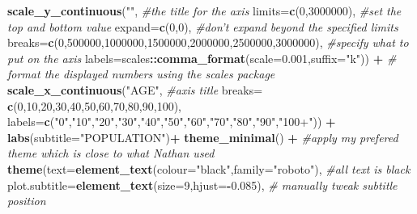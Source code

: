 \documentclass[]{article}
\newenvironment{Shaded}{\begin{snugshade}}{\end{snugshade}}
\newcommand{\KeywordTok}[1]{\textcolor[rgb]{0.13,0.29,0.53}{\textbf{#1}}}
\newcommand{\DataTypeTok}[1]{\textcolor[rgb]{0.13,0.29,0.53}{#1}}
\newcommand{\DecValTok}[1]{\textcolor[rgb]{0.00,0.00,0.81}{#1}}
\newcommand{\FloatTok}[1]{\textcolor[rgb]{0.00,0.00,0.81}{#1}}
\newcommand{\StringTok}[1]{\textcolor[rgb]{0.31,0.60,0.02}{#1}}
\newcommand{\CommentTok}[1]{\textcolor[rgb]{0.56,0.35,0.01}{\textit{#1}}}
\newcommand{\OperatorTok}[1]{\textcolor[rgb]{0.81,0.36,0.00}{\textbf{#1}}}
\newcommand{\NormalTok}[1]{#1}
\begin{document}
\begin{Shaded}
\begin{Highlighting}[]
{\StringTok{  }\KeywordTok{scale_y_continuous}\NormalTok{(}\StringTok{""}\NormalTok{, }\CommentTok{#the title for the axis}
                     \DataTypeTok{limits=}\KeywordTok{c}\NormalTok{(}\DecValTok{0}\NormalTok{,}\DecValTok{3000000}\NormalTok{), }\CommentTok{#set the top and bottom value}
                     \DataTypeTok{expand=}\KeywordTok{c}\NormalTok{(}\DecValTok{0}\NormalTok{,}\DecValTok{0}\NormalTok{), }\CommentTok{#don't expand beyond the specified limits}
                     \DataTypeTok{breaks=}\KeywordTok{c}\NormalTok{(}\DecValTok{0}\NormalTok{,}\DecValTok{500000}\NormalTok{,}\DecValTok{1000000}\NormalTok{,}\DecValTok{1500000}\NormalTok{,}\DecValTok{2000000}\NormalTok{,}\DecValTok{2500000}\NormalTok{,}\DecValTok{3000000}\NormalTok{), }\CommentTok{#specify what to put on the axis}
                     \DataTypeTok{labels=}\NormalTok{scales}\OperatorTok{::}\KeywordTok{comma_format}\NormalTok{(}\DataTypeTok{scale=}\FloatTok{0.001}\NormalTok{,}\DataTypeTok{suffix=}\StringTok{"k"}\NormalTok{)) }\OperatorTok{+}\StringTok{ }\CommentTok{# format the displayed numbers using the scales package}
\StringTok{  }\KeywordTok{scale_x_continuous}\NormalTok{(}\StringTok{"AGE"}\NormalTok{, }\CommentTok{#axis title}
                     \DataTypeTok{breaks=} \KeywordTok{c}\NormalTok{(}\DecValTok{0}\NormalTok{,}\DecValTok{10}\NormalTok{,}\DecValTok{20}\NormalTok{,}\DecValTok{30}\NormalTok{,}\DecValTok{40}\NormalTok{,}\DecValTok{50}\NormalTok{,}\DecValTok{60}\NormalTok{,}\DecValTok{70}\NormalTok{,}\DecValTok{80}\NormalTok{,}\DecValTok{90}\NormalTok{,}\DecValTok{100}\NormalTok{),}
                     \DataTypeTok{labels=}\KeywordTok{c}\NormalTok{(}\StringTok{"0"}\NormalTok{,}\StringTok{"10"}\NormalTok{,}\StringTok{"20"}\NormalTok{,}\StringTok{"30"}\NormalTok{,}\StringTok{"40"}\NormalTok{,}\StringTok{"50"}\NormalTok{,}\StringTok{"60"}\NormalTok{,}\StringTok{"70"}\NormalTok{,}\StringTok{"80"}\NormalTok{,}\StringTok{"90"}\NormalTok{,}\StringTok{"100+"}\NormalTok{)) }\OperatorTok{+}
\StringTok{  }\KeywordTok{labs}\NormalTok{(}\DataTypeTok{subtitle=}\StringTok{"POPULATION"}\NormalTok{)}\OperatorTok{+}
\StringTok{  }\KeywordTok{theme_minimal}\NormalTok{() }\OperatorTok{+}\StringTok{ }\CommentTok{#apply my prefered theme which is close to what Nathan used}
\StringTok{  }\KeywordTok{theme}\NormalTok{(}\DataTypeTok{text=}\KeywordTok{element_text}\NormalTok{(}\DataTypeTok{colour=}\StringTok{"black"}\NormalTok{,}\DataTypeTok{family=}\StringTok{"roboto"}\NormalTok{), }\CommentTok{#all text is black}
        \DataTypeTok{plot.subtitle=}\KeywordTok{element_text}\NormalTok{(}\DataTypeTok{size=}\DecValTok{9}\NormalTok{,}\DataTypeTok{hjust=}\OperatorTok{-}\FloatTok{0.085}\NormalTok{), }\CommentTok{# manually tweak subtitle position}
}
\end{Highlighting}
\end{Shaded}
\end{document}
